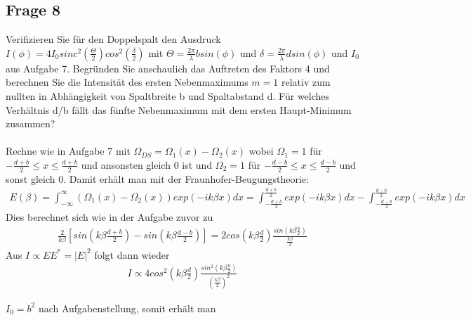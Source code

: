\documentclass[a4paper,10pt]{scrartcl}
\begin{document}
\subsection{Frage 8}
Verifizieren Sie für den Doppelspalt den Ausdruck\(I(\phi)=4I_{0}sinc^{2}(\frac{\Theta}{2})cos^{2}(\frac{\delta}{2})\) mit \(\Theta=\frac{2\pi}{\lambda}bsin(\phi)\) und \(\delta=\frac{2\pi}{\lambda}dsin(\phi)\) und \(I_{0}\) aus Aufgabe 7. Begründen Sie anschaulich das Auftreten des Faktors 4 und berechnen Sie die Intensität des
ersten Nebenmaximums \(m=1\) relativ zum nullten in Abhängigkeit von Spaltbreite b und
Spaltabstand d. Für welches Verhältnis d/b fällt das fünfte Nebenmaximum mit dem ersten
Haupt-Minimum zusammen?\\
\\
Rechne wie in Aufgabe 7 mit \(\Omega_{DS}=\Omega_{1}(x)-\Omega_{2}(x)\) wobei \(\Omega_{1}=1\) für \(-\frac{d+b}{2}\leq x\leq \frac{d+b}{2}\) und ansonsten gleich 0 ist und \(\Omega_{2}=1\) für \(-\frac{d-b}{2}\leq x \leq \frac{d-b}{2}\) und sonst gleich 0. Damit erhält man mit der Fraunhofer-Beugungstheorie:
\begin{align*}
E(\beta)=\int_{-\infty}^{\infty}(\Omega_{1}(x)-\Omega_{2}(x))exp(-ik\beta x)dx=\int_{-\frac{d+b}{2}}^{\frac{d+b}{2}}exp(-ik\beta x)dx-\int_{-\frac{d-b}{2}}^{\frac{d-b}{2}}exp(-ik\beta x)dx
\end{align*}
Dies berechnet sich wie in der Aufgabe zuvor zu
\begin{align*}
\frac{2}{k\beta}[sin(k\beta\frac{d+b}{2})-sin(k\beta \frac{d-b}{2})]=2cos(k\beta \frac{d}{2})\frac{sin(k\beta\frac{b}{2})}{\frac{k\beta}{2}}
\end{align*}
Aus \(I\propto EE^{*}=|E|^{2}\) folgt dann wieder
\begin{align*}
I\propto 4cos^{2}(k\beta \frac{d}{2})\frac{sin^{2}(k\beta\frac{b}{2})}{(\frac{k\beta}{2})^{2}}
\end{align*}

\(I_{0}=b^{2}\) nach Aufgabenstellung, somit erhält man
\end{document}
